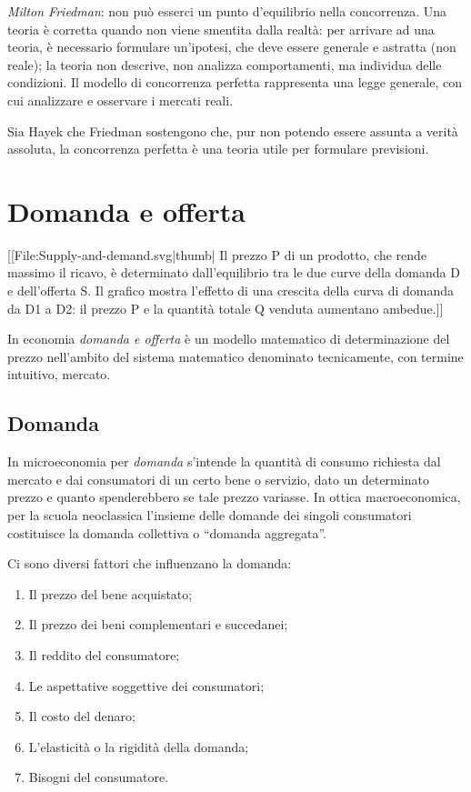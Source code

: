 \emph{Milton Friedman}: non può esserci un punto d'equilibrio nella 
concorrenza. Una teoria è corretta quando non viene smentita dalla realtà: per 
arrivare ad una teoria, è necessario formulare un'ipotesi, che deve essere 
generale e astratta (non reale); la teoria non descrive, non analizza 
comportamenti, ma individua delle condizioni. Il modello di concorrenza 
perfetta rappresenta una legge generale, con cui analizzare e osservare i 
mercati reali.

Sia Hayek che Friedman sostengono che, pur non potendo essere assunta a verità 
assoluta, la concorrenza perfetta è una teoria utile per formulare previsioni.

% 
% 

\section{Domanda e offerta}

[[File:Supply-and-demand.svg|thumb|
Il prezzo P di un prodotto, che rende 
massimo il ricavo, è determinato dall'equilibrio tra le due curve della domanda 
D e dell'offerta S. Il grafico mostra l'effetto di una crescita della curva di 
domanda da D1 a D2: il prezzo P e la quantità totale Q venduta aumentano 
ambedue.]]

In economia \emph{domanda e offerta} è un modello matematico di 
determinazione del prezzo nell'ambito del sistema 
matematico denominato tecnicamente, con termine intuitivo, mercato.

\subsection{Domanda}

In microeconomia per \emph{domanda} s'intende la quantità di consumo 
richiesta dal mercato e dai consumatori di un certo bene o servizio, dato 
un determinato prezzo e quanto spenderebbero se tale prezzo variasse. In ottica 
macroeconomica, per la scuola neoclassica l'insieme 
delle domande dei singoli consumatori costituisce la domanda collettiva o 
``domanda aggregata''.

Ci sono diversi fattori che influenzano la domanda:
\begin{enumerate} [noitemsep]
 \item Il prezzo del bene acquistato;
 \item Il prezzo dei beni complementari e succedanei;
 \item Il reddito del consumatore;
 \item Le aspettative soggettive dei consumatori;
 \item Il costo del denaro;
 \item L'elasticità o la rigidità della domanda;
 \item Bisogni del consumatore.
\end{enumerate}

